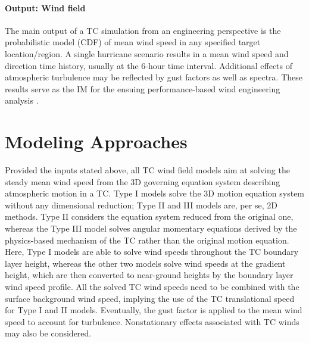 \paragraph{Output: Wind field} The main output of a TC simulation from an engineering perspective is the probabilistic model (CDF) of mean wind speed in any specified target location/region. A single hurricane scenario results in a mean wind speed and direction time history, usually at the 6-hour time interval. Additional effects of atmospheric turbulence may be reflected by gust factors as well as spectra. These results serve as the IM for the ensuing performance-based wind engineering analysis \citep{barbato2013performancebased, chuang2019efficient, liu2014projections, spence2014performancebased, unnikrishnan2016performancebased, xiao2011typhoon, yau2011hurricane}.

\section{Modeling Approaches}
\label{sec:storm_wind_methods}

Provided the inputs stated above, all TC wind field models aim at solving the steady mean wind speed from the 3D governing equation system describing atmospheric motion in a TC. Type I models solve the 3D motion equation system without any dimensional reduction; Type II and III models are, per se, 2D methods. Type II considers the equation system reduced from the original one, whereas the Type III model solves angular momentary equations derived by the physics-based mechanism of the TC rather than the original motion equation. Here, Type I models are able to solve wind speeds throughout the TC boundary layer height, whereas the other two models solve wind speeds at the gradient height, which are then converted to near-ground heights by the boundary layer wind speed profile. All the solved TC wind speeds need to be combined with the surface background wind speed, implying the use of the TC translational speed for Type I and II models. Eventually, the gust factor is applied to the mean wind speed to account for turbulence. Nonstationary effects associated with TC winds may also be considered.

